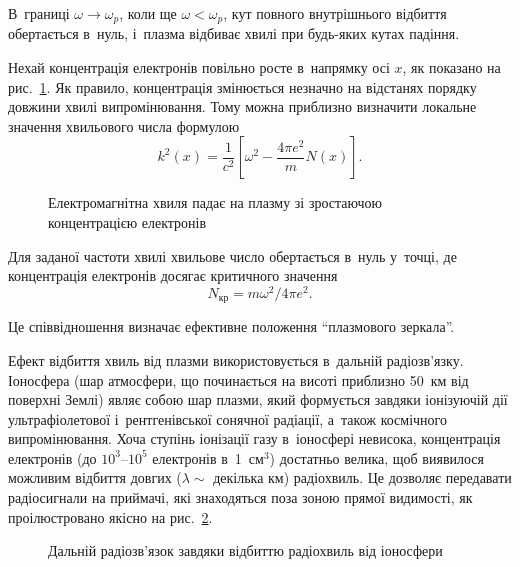 В~границі $\omega \to \omega_p$, коли ще $\omega < \omega_p$, кут повного внутрішнього відбиття обертається в~нуль, і~плазма відбиває хвилі при будь-яких кутах падіння.

Нехай концентрація електронів повільно росте в~напрямку осі $x$, як показано на рис.~\ref{pic:gradient-plasma}. Як правило, концентрація змінюється незначно на відстанях порядку довжини хвилі випромінювання. Тому можна приблизно визначити локальне значення хвильового числа формулою
\begin{equation*}
	k^2(x) = \frac{1}{c^2}\left[\omega^2 - \frac{4\pi e^2}{m}N(x)\right].
\end{equation*}

\begin{figure}[h!]\centering
	\caption{Електромагнітна хвиля падає на плазму зі зростаючою концентрацією електронів}
	\label{pic:gradient-plasma}
\end{figure}

Для заданої частоти хвилі хвильове число обертається в~нуль у~точці, де концентрація електронів досягає критичного значення
\begin{equation*}
	N_{\text{кр}} = m\omega^2/4\pi e^2.
\end{equation*}

Це співвідношення визначає ефективне положення \enquote{плазмового зеркала}.

Ефект відбиття хвиль від плазми використовується в~дальній радіозв'язку. Іоносфера (шар атмосфери, що починається на висоті приблизно 50~км від поверхні Землі) являє собою шар плазми, який формується завдяки іонізуючій дії ультрафіолетової і~рентгенівської сонячної радіації, а~також космічного випромінювання. Хоча ступінь іонізації газу в~іоносфері невисока, концентрація електронів (до $10^3$--$10^5$ електронів в~1~см$^3$) достатньо велика, щоб виявилося можливим відбиття довгих ($\lambda \sim$ декілька км) радіохвиль. Це дозволяє передавати радіосигнали на приймачі, які знаходяться поза зоною прямої видимості, як проілюстровано якісно на рис.~\ref{pic:radio-communication}.

\begin{figure}[h!]\centering
	\caption{Дальній радіозв'язок завдяки відбиттю радіохвиль від іоносфери}
	\label{pic:radio-communication}
\end{figure}

